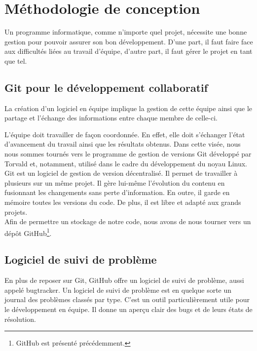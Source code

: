 \chapter{Méthodologie de conception}
Un programme informatique, comme n'importe quel projet, nécessite une bonne gestion pour pouvoir assurer son bon développement. 
D'une part, il faut faire face aux difficultés liées au travail d'équipe, d'autre part, il faut gérer le projet en tant que tel.

  \section{Git pour le développement collaboratif}
  La création d'un logiciel en équipe implique la gestion de cette équipe ainsi que le partage et l'échange des
  informations entre chaque membre de celle-ci.
  
  L'équipe doit travailler de façon coordonnée. En effet, elle doit s'échanger l'état
  d'avancement du travail ainsi que les résultats obtenus. Dans cette visée, nous nous sommes tournés vers le programme de gestion de versions Git développé par Torvald et, notamment, utilisé dans le cadre du développement du noyau Linux.\\
\newline
\indent
  Git est un logiciel de gestion de version décentralisé. Il permet de
  travailler à plusieurs sur un même projet. Il gère lui-même l'évolution du
  contenu en fusionnant les changements sans perte d'information. En outre, il garde
en mémoire toutes les versions du code. De plus, il est libre et
  adapté aux grands projets.\\
  \newline
  \indent
  Afin de permettre un stockage de notre code, nous avons de nous tourner vers un dépôt GitHub\footnote{GitHub est présenté précédemment.}.
  
  

  \section{Logiciel de suivi de problème}
  
  En plus de reposer sur Git, GitHub offre un logiciel de suivi de problème, aussi appelé  bugtracker. Un logiciel de suivi de problème est en quelque sorte un journal des problèmes classés par type.  C'est un outil particulièrement utile pour le développement en équipe. Il donne un aperçu clair des bugs et de leurs états de résolution.

